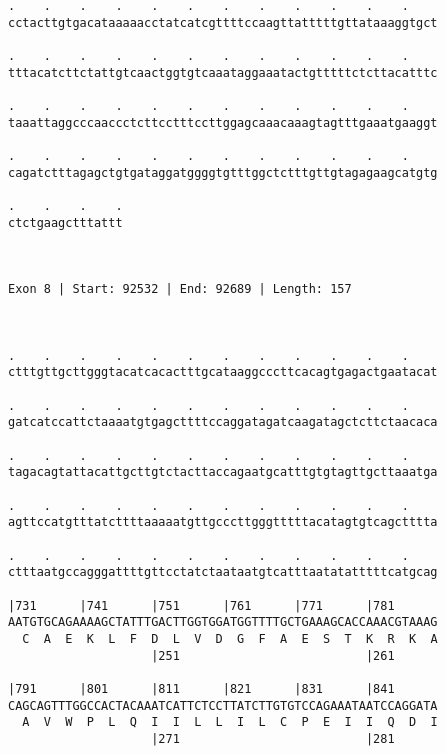 \documentclass{article}
\begin{document}
\begin{Verbatim}
.    .    .    .    .    .    .    .    .    .    .    .    
cctacttgtgacataaaaacctatcatcgttttccaagttatttttgttataaaggtgct
                                                            
.    .    .    .    .    .    .    .    .    .    .    .    
tttacatcttctattgtcaactggtgtcaaataggaaatactgtttttctcttacatttc
                                                            
.    .    .    .    .    .    .    .    .    .    .    .    
taaattaggcccaaccctcttcctttccttggagcaaacaaagtagtttgaaatgaaggt
                                                            
.    .    .    .    .    .    .    .    .    .    .    .    
cagatctttagagctgtgataggatggggtgtttggctctttgttgtagagaagcatgtg
                                                            
.    .    .    .
ctctgaagctttattt
                
                
 
Exon 8 | Start: 92532 | End: 92689 | Length: 157



.    .    .    .    .    .    .    .    .    .    .    .    
ctttgttgcttgggtacatcacactttgcataaggcccttcacagtgagactgaatacat
                                                            
.    .    .    .    .    .    .    .    .    .    .    .    
gatcatccattctaaaatgtgagcttttccaggatagatcaagatagctcttctaacaca
                                                            
.    .    .    .    .    .    .    .    .    .    .    .    
tagacagtattacattgcttgtctacttaccagaatgcatttgtgtagttgcttaaatga
                                                            
.    .    .    .    .    .    .    .    .    .    .    .    
agttccatgtttatcttttaaaaatgttgcccttgggtttttacatagtgtcagctttta
                                                            
.    .    .    .    .    .    .    .    .    .    .    .    
ctttaatgccagggattttgttcctatctaataatgtcatttaatatatttttcatgcag
                                                            
|731      |741      |751      |761      |771      |781      
AATGTGCAGAAAAGCTATTTGACTTGGTGGATGGTTTTGCTGAAAGCACCAAACGTAAAG
  C  A  E  K  L  F  D  L  V  D  G  F  A  E  S  T  K  R  K  A
                    |251                          |261      
  
|791      |801      |811      |821      |831      |841      
CAGCAGTTTGGCCACTACAAATCATTCTCCTTATCTTGTGTCCAGAAATAATCCAGGATA
  A  V  W  P  L  Q  I  I  L  L  I  L  C  P  E  I  I  Q  D  I
                    |271                          |281      
  

\end{Verbatim}
\end{document}
